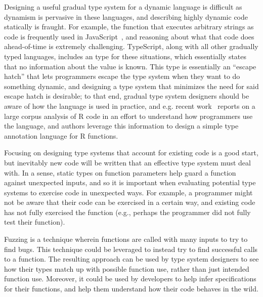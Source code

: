Designing a useful gradual type system for a dynamic language is difficult as dynamism is pervasive in these languages, and describing highly dynamic code statically is fraught.
For example, the  function that executes arbitrary strings as code is frequently used in JavaScript~\cite{richards2011eval}, and reasoning about what that code does ahead-of-time is extremely challenging.
TypeScript, along with all other gradually typed languages, includes an  type for these situations, which essentially states that no information about the value is known.
This  type is essentially an ``escape hatch'' that lets programmers escape the type system when they want to do something dynamic, and designing a type system that minimizes the need for said escape hatch is desirable; to that end, gradual type system designers should be aware of how the language is used in practice, and e.g. recent work~\cite{turcotte2020designing} reports on a large corpus analysis of R code in an effort to understand how programmers use the language, and authors leverage this information to design a simple type annotation language for R functions.

Focusing on designing type systems that account for existing code is a good start, but inevitably new code will be written that an effective type system must deal with.
In a sense, static types on function parameters help guard a function against unexpected inputs, and so it is important when evaluating potential type systems to exercise code in unexpected ways. 
For example, a programmer might not be aware that their code can be exercised in a certain way, and existing code has not fully exercised the function (e.g., perhaps the programmer did not fully test their function).

Fuzzing is a technique wherein functions are called with many inputs to try to find bugs.
This technique could be leveraged to instead try to find successful calls to a function.
The resulting approach can be used by type system designers to see how their types match up with possible function use, rather than just intended function use.
Moreover, it could be used by developers to help infer specifications for their functions, and help them understand how their code behaves in the wild.

